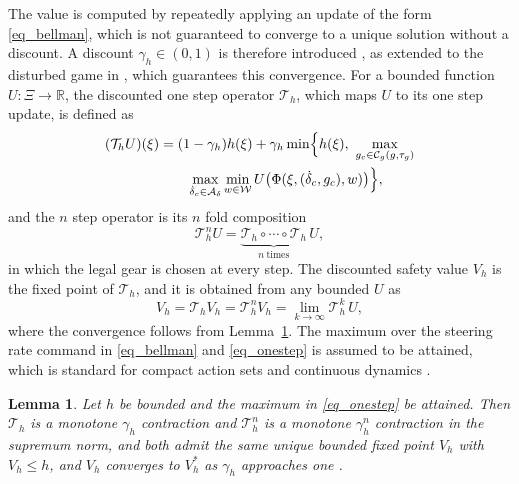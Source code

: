 \documentclass[lettersize,journal]{IEEEtran}
\newtheorem{lemma}{Lemma}
\newcommand{\calA}{\mathcal{A}}
\newcommand{\calC}{\mathcal{C}}
\newcommand{\calW}{\mathcal{W}}
\newcommand{\calT}{\mathcal{T}}
\begin{document}
The value is computed by repeatedly applying an update of the form \eqref{eq_bellman}, which is not guaranteed to converge to a unique solution without a discount. A discount $\gamma_h \in (0,1)$ is therefore introduced \cite{fisac2019}, as extended to the disturbed game in \cite{li2023cdc}, which guarantees this convergence. For a bounded function $U \colon \Xi \to \mathbb{R}$, the discounted one step operator $\calT_h$, which maps $U$ to its one step update, is defined as
\begin{equation}
\begin{aligned}
(\calT_h U)(\xi) &= (1-\gamma_h) h(\xi) + \gamma_h \min\Bigl\{ h(\xi),\ \max_{g_c \in \calC_g(g, \tau_g)} \\
&\qquad \max_{\dot{\delta}_c \in \calA_\delta} \min_{w \in \calW} U\bigl(\Phi(\xi, (\dot{\delta}_c, g_c), w)\bigr) \Bigr\},
\end{aligned}
\label{eq_onestep}
\end{equation}
and the $n$ step operator is its $n$ fold composition
\begin{equation}
\calT_h^{n} U = \underbrace{\calT_h \circ \cdots \circ \calT_h}_{n\ \text{times}}\, U,
\label{eq_nstep}
\end{equation}
in which the legal gear is chosen at every step. The discounted safety value $V_h$ is the fixed point of $\calT_h$, and it is obtained from any bounded $U$ as
\begin{equation}
V_h = \calT_h V_h = \calT_h^{n} V_h = \lim_{k \to \infty} \calT_h^{k}\, U,
\label{eq_fixed}
\end{equation}
where the convergence follows from Lemma~\ref{lem_aug}. The maximum over the steering rate command in \eqref{eq_bellman} and \eqref{eq_onestep} is assumed to be attained, which is standard for compact action sets and continuous dynamics \cite{bertsekas1972reach,akametalu2024minimum}.

\begin{lemma}\label{lem_aug}
Let $h$ be bounded and the maximum in \eqref{eq_onestep} be attained. Then $\calT_h$ is a monotone $\gamma_h$ contraction and $\calT_h^{n}$ is a monotone $\gamma_h^{n}$ contraction in the supremum norm, and both admit the same unique bounded fixed point $V_h$ with $V_h \le h$, and $V_h$ converges to $V_h^{*}$ as $\gamma_h$ approaches one \cite{fisac2019,li2023cdc}.
\end{lemma}
\end{document}
